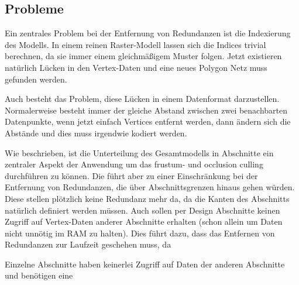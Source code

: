
\subsection{Probleme}
Ein zentrales Problem bei der Entfernung von Redundanzen ist die Indexierung des Modells. In einem reinen Raster-Modell lassen sich die Indices trivial berechnen, da sie immer einem gleichmäßigem Muster folgen. Jetzt existieren natürlich Lücken in den Vertex-Daten und eine neues Polygon Netz muss gefunden werden. 

Auch besteht das Problem, diese Lücken in einem Datenformat darzustellen. Normalerweise besteht immer der gleiche Abstand zwischen zwei benachbarten Datenpunkte, wenn jetzt einfach Vertices entfernt werden, dann ändern sich die Abstände und dies muss irgendwie kodiert werden.




Wie beschrieben, ist die Unterteilung des Gesamtmodells in Abschnitte ein zentraler Aspekt der Anwendung um das frustum- und occlusion culling durchführen zu können. Die führt aber zu einer Einschränkung bei der Entfernung von Redundanzen, die über Abschnittsgrenzen hinaus gehen würden. Diese stellen plötzlich keine Redundanz mehr da, da die Kanten des Abschnitts natürlich definiert werden müssen. Auch sollen per Design Abschnitte keinen Zugriff auf Vertex-Daten anderer Abschnitte erhalten (schon allein um Daten nicht unnötig im RAM zu halten). Dies führt dazu, dass das Entfernen von Redundanzen zur Laufzeit geschehen muss, da




Einzelne Abschnitte haben keinerlei Zugriff auf Daten der anderen Abschnitte und benötigen eine 





